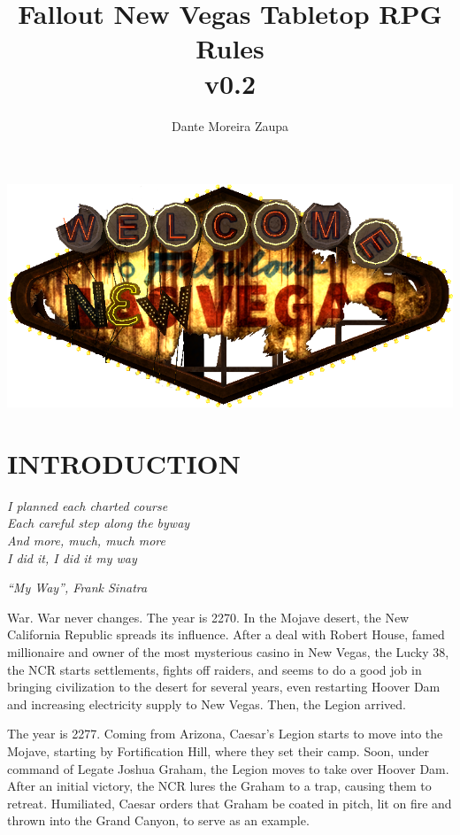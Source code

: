 \documentclass[11pt]{article} %
\title{Fallout New Vegas Tabletop RPG Rules\\v0.2}
\author{Dante Moreira Zaupa}
\begin{document}
\maketitle
\begin{center}
\includegraphics[scale=0.5]{logo_new_vegas.png}
\end{center}
\newpage
\tableofcontents
\newpage
\listoftables
\newpage



\section{INTRODUCTION}

\epigraph{\textit{I planned each charted course \\
Each careful step along the byway \\
And more, much, much more \\
I did it, I did it my way}}{\textit{``My Way'', Frank Sinatra}}

War. War never changes. The year is 2270. In the Mojave desert, the New California Republic spreads its influence. After a deal with Robert House, famed millionaire and owner of the most mysterious casino in New Vegas, the Lucky 38, the NCR starts settlements, fights off raiders, and seems to do a good job in bringing civilization to the desert for several years, even restarting Hoover Dam and increasing electricity supply to New Vegas. Then, the Legion arrived.

The year is 2277. Coming from Arizona, Caesar's Legion starts to move into the Mojave, starting by Fortification Hill, where they set their camp. Soon, under command of Legate Joshua Graham, the Legion moves to take over Hoover Dam. After an initial victory, the NCR lures the Graham to a trap, causing them to retreat. Humiliated, Caesar orders that Graham be coated in pitch, lit on fire and thrown into the Grand Canyon, to serve as an example. 
\end{document}
